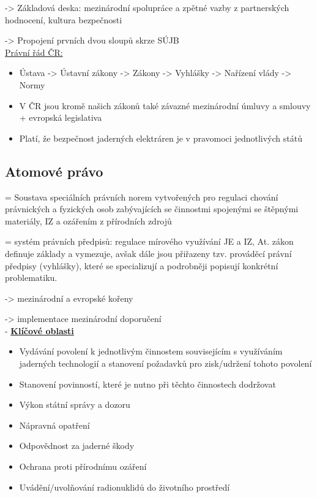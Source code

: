 ->	Základová deska: mezinárodní spolupráce a zpětné vazby z partnerských hodnocení, kultura bezpečnosti

-> Propojení prvních dvou sloupů skrze SÚJB
\\

\underline{Právní řád ČR:}

\begin{itemize}
    \item Ústava -> Ústavní zákony -> Zákony -> Vyhlášky -> Nařízení vlády -> Normy
    \item V ČR jsou kromě našich zákonů také závazné mezinárodní úmluvy a smlouvy + evropská legislativa
    \item Platí, že bezpečnost jaderných elektráren je v pravomoci jednotlivých států
\end{itemize}



\subsection{Atomové právo}
= Soustava speciálních právních norem vytvořených pro regulaci chování právnických a fyzických osob zabývajících se činnostmi spojenými se štěpnými materiály, IZ a ozářením z přírodních zdrojů

\noindent= systém právních předpisů: regulace mírového využívání JE a IZ, At. zákon definuje základy a vymezuje, avšak dále jsou přiřazeny tzv. prováděcí právní předpisy (vyhlášky), které se specializují a podrobněji popisují konkrétní problematiku.

-> mezinárodní a evropské kořeny

-> implementace mezinárodní doporučení
\\

\noindent- \underline{\textbf{Klíčové oblasti}}

\begin{itemize}

\item	Vydávání povolení k jednotlivým činnostem souvisejícím s využíváním jaderných technologií a stanovení požadavků pro zisk/udržení tohoto povolení

\item	Stanovení povinností, které je nutno při těchto činnostech dodržovat

\item	Výkon státní správy a dozoru

\item	Nápravná opatření

\item	Odpovědnost za jaderné škody

\item	Ochrana proti přírodnímu ozáření

\item	Uvádění/uvolňování radionuklidů do životního prostředí
\end{itemize}



